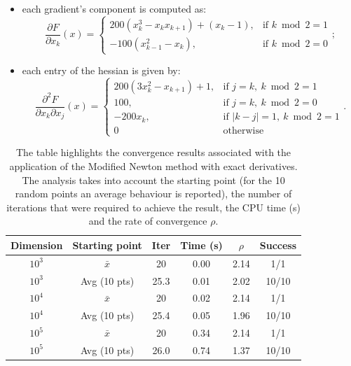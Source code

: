 \documentclass[a4paper,12pt]{article}
\begin{document}
	\begin{itemize}
		\item each gradient's component is computed as:
		\[
		\frac{\partial F}{\partial x_k}(x) =
		\begin{cases}
			200(x_k^3 - x_k x_{k+1}) + (x_k - 1), & \text{if } k \bmod 2 = 1 \\
			-100(x_{k-1}^2 - x_k),               & \text{if } k \bmod 2 = 0
		\end{cases};
		\]
		
		\item each entry of the hessian is given by:
		\[
		\frac{\partial^2 F}{\partial x_k \partial x_j}(x) =
		\begin{cases}
			200(3x_k^2 - x_{k+1}) + 1, & \text{if } j = k,\ k \bmod 2 = 1 \\
			100,                      & \text{if } j = k,\ k \bmod 2 = 0 \\
			-200x_k,                  & \text{if } |k - j| = 1,\ k \bmod 2 = 1 \\
			0                       & \text{otherwise}
		\end{cases}.
		\]
		
	\end{itemize}
	
	



	
		
	
	
	 \begin{center}
	 	\begin{table}
	 		\begin{tabular}{|c|c|c|c|c|c|}
	 			\hline
	 			\textbf{Dimension} & \textbf{Starting point} & \textbf{Iter} & \textbf{Time (s)} & \textbf{\(\rho\)} & \textbf{Success} \\
	 			\hline
	 			$10^3$ & $\bar{x}$         & 20   & 0.00 & 2.14 & 1/1 \\
	 			$10^3$ & Avg (10 pts)      & 25.3 & 0.01 & 2.02 & 10/10 \\
	 			\hline
	 			$10^4$ & $\bar{x}$         & 20   & 0.02 & 2.14 & 1/1 \\
	 			$10^4$ & Avg (10 pts)      & 25.4 & 0.05 & 1.96 & 10/10 \\
	 			\hline
	 			$10^5$ & $\bar{x}$         & 20   & 0.34 & 2.14 & 1/1 \\
	 			$10^5$ & Avg (10 pts)      & 26.0 & 0.74 & 1.37 & 10/10 \\
	 			\hline
	 		\end{tabular}
	 		\caption{The table highlights the convergence results associated with the application of the Modified Newton method with exact derivatives. The analysis takes into account the starting point (for the 10 random points an average behaviour is reported), the number of iterations that were required to achieve the result, the CPU time (s) and the rate of convergence $\rho$.}
	 		\label{table3}
	 	\end{table}
	 \end{center}
\end{document}
